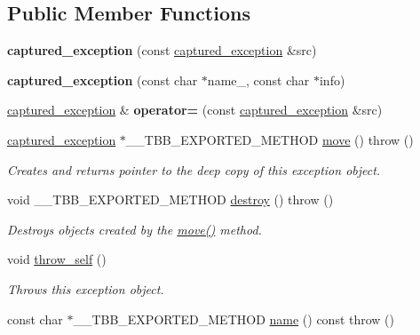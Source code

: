 \subsection*{Public Member Functions}
\begin{DoxyCompactItemize}
\item 
\hypertarget{classtbb_1_1captured__exception_a56f6c51b6d4f8ce31669457ff8f0c07f}{}{\bfseries captured\+\_\+exception} (const \hyperlink{classtbb_1_1captured__exception}{captured\+\_\+exception} \&src)\label{classtbb_1_1captured__exception_a56f6c51b6d4f8ce31669457ff8f0c07f}

\item 
\hypertarget{classtbb_1_1captured__exception_ab3d72662db6a2badffa95a649a6c0bdd}{}{\bfseries captured\+\_\+exception} (const char $\ast$name\+\_\+, const char $\ast$info)\label{classtbb_1_1captured__exception_ab3d72662db6a2badffa95a649a6c0bdd}

\item 
\hypertarget{classtbb_1_1captured__exception_a78a66603238d40da9ec6a750b6a2425c}{}\hyperlink{classtbb_1_1captured__exception}{captured\+\_\+exception} \& {\bfseries operator=} (const \hyperlink{classtbb_1_1captured__exception}{captured\+\_\+exception} \&src)\label{classtbb_1_1captured__exception_a78a66603238d40da9ec6a750b6a2425c}

\item 
\hyperlink{classtbb_1_1captured__exception}{captured\+\_\+exception} $\ast$\+\_\+\+\_\+\+T\+B\+B\+\_\+\+E\+X\+P\+O\+R\+T\+E\+D\+\_\+\+M\+E\+T\+H\+O\+D \hyperlink{classtbb_1_1captured__exception_abb221485cd260349efdef681f633a6a4}{move} ()  throw ()
\begin{DoxyCompactList}\small\item\em Creates and returns pointer to the deep copy of this exception object. \end{DoxyCompactList}\item 
void \+\_\+\+\_\+\+T\+B\+B\+\_\+\+E\+X\+P\+O\+R\+T\+E\+D\+\_\+\+M\+E\+T\+H\+O\+D \hyperlink{classtbb_1_1captured__exception_a3006b6825dda6c746d28fb748f5675de}{destroy} ()  throw ()
\begin{DoxyCompactList}\small\item\em Destroys objects created by the \hyperlink{classtbb_1_1captured__exception_abb221485cd260349efdef681f633a6a4}{move()} method. \end{DoxyCompactList}\item 
void \hyperlink{classtbb_1_1captured__exception_ac9ae925678fcc0cc02a74df7d06b8d63}{throw\+\_\+self} ()
\begin{DoxyCompactList}\small\item\em Throws this exception object. \end{DoxyCompactList}\item 
\hypertarget{classtbb_1_1captured__exception_a23426113851b78d3f0069956afd21976}{}const char $\ast$\+\_\+\+\_\+\+T\+B\+B\+\_\+\+E\+X\+P\+O\+R\+T\+E\+D\+\_\+\+M\+E\+T\+H\+O\+D \hyperlink{classtbb_1_1captured__exception_a23426113851b78d3f0069956afd21976}{name} () const   throw ()\label{classtbb_1_1captured__exception_a23426113851b78d3f0069956afd21976}


\end{DoxyCompactItemize}
